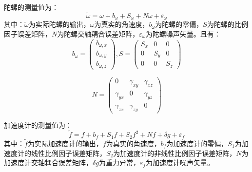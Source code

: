\documentclass[12pt, twocolumn]{article}
\begin{document}
	陀螺的测量值为：
	\begin{equation*}
		\widetilde{\omega}=\omega+b_\omega+S_\omega+N\omega+\varepsilon_\omega
	\end{equation*}
	其中：$\widetilde{\omega}$为实际陀螺的输出，$\omega$为真实的角速度，$b_\omega$为陀螺的零偏，$S$为陀螺的比例因子误差矩阵，$N$为陀螺交轴耦合误差矩阵，$\varepsilon_\omega$为陀螺噪声矢量。且有：
	\begin{equation*}
		b_\omega=\begin{pmatrix}
			b_{\omega,x}\\
			b_{\omega,y}\\
			b_{\omega,z}
		\end{pmatrix},
			S=\begin{pmatrix}
		S_x&0&0\\
		0&S_y&0\\
		0&0&S_z
		\end{pmatrix}
	\end{equation*}
	
	\begin{equation*}
				N=\begin{pmatrix}
			0&\gamma_{xy}&\gamma_{xz}\\
			\gamma_{yx}&0&\gamma_{yz}\\
			\gamma_{zx}&\gamma_{zy}&0
		\end{pmatrix}
	\end{equation*}
	
	加速度计的测量值为：
	\begin{equation*}
		\widetilde{f}=f+b_f+S_1f+S_2f^2+Nf+\delta g+\varepsilon_f
	\end{equation*}
	其中：$\widetilde{f}$为实际加速度计的输出，$f$为真实的角速度，$b_f$为加速度计的零偏，$S_1$为加速度计的线性比例因子误差矩阵，$S_2$为加速度计的非线性比例因子误差矩阵，$N$为加速度计交轴耦合误差矩阵，$\delta g$为重力异常，$\varepsilon_f$为加速度计噪声矢量。
	
\end{document}
